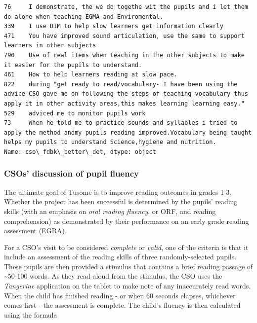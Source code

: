 \documentclass[11pt]{article}
\begin{document}
\begin{Verbatim}[commandchars=\\\{\}]
76     I demonstrate, the we do togethe wit the pupils and i let them do alone when teaching EGMA and Enviromental.                                                                                             
339    I use DIM to help slow learners get information clearly                                                                                                                                                  
471    You have improved sound articulation, use the same to support learners in other subjects                                                                                                                 
790    Use of real items when teaching in the other subjects to make it easier for the pupils to understand.                                                                                                    
461    How to help learners reading at slow pace.                                                                                                                                                               
822    during "get ready to read/vocabulary- I have been using the advice CSO gave me on following the steps of teaching vocabulary thus apply it in other activity areas,this makes learning learning easy."   
529    adviced me to monitor pupils work                                                                                                                                                                        
73     When he told me to practice sounds and syllables i tried to apply the method andmy pupils reading improved.Vocabulary being taught helps my pupils to understand Science,hygiene and nutrition.          
Name: cso\_fdbk\_better\_det, dtype: object

    \end{Verbatim}

    \hypertarget{csos-discussion-of-pupil-fluency}{%
\subsubsection{CSOs' discussion of pupil
fluency}\label{csos-discussion-of-pupil-fluency}}

The ultimate goal of Tusome is to improve reading outcomes in grades
1-3. Whether the project has been successful is determined by the
pupils' reading skills (with an emphasis on \emph{oral reading fluency},
or ORF, and reading comprehension) as demonstrated by their performance
on an early grade reading assessment (EGRA).

For a CSO's visit to be considered \emph{complete} or \emph{valid}, one
of the criteria is that it include an assessment of the reading skills
of three randomly-selected pupils. These pupils are then provided a
stimulus that contains a brief reading passage of
\textasciitilde{}50-100 words. As they read aloud from the stimulus, the
CSO uses the \emph{Tangerine} application on the tablet to make note of
any inaccurately read words. When the child has finished reading - or
when 60 seconds elapses, whichever comes first - the assessment is
complete. The child's fluency is then calculated using the formula
\end{document}
